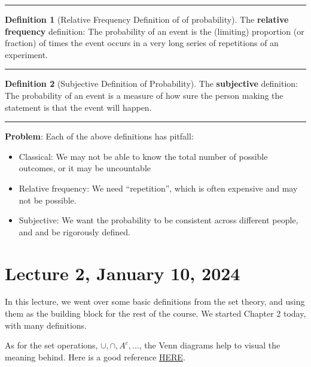 \documentclass[
]{book}
\providecommand{\tightlist}{%
  \setlength{\itemsep}{0pt}\setlength{\parskip}{0pt}}
\theoremstyle{definition}
\newtheorem{definition}{Definition}[chapter]
\theoremstyle{definition}
\theoremstyle{definition}
\theoremstyle{definition}
\theoremstyle{remark}
\begin{document}
\begin{center}\rule{0.5\linewidth}{0.5pt}\end{center}

\begin{definition}[Relative Frequency Definition of of probability]
The \textbf{relative frequency} definition: The probability of an event
is the (limiting) proportion (or fraction) of times the event occurs in a very
long series of repetitions of an experiment.
\end{definition}

\begin{center}\rule{0.5\linewidth}{0.5pt}\end{center}

\begin{definition}[Subjective Definition of Probability]
The \textbf{subjective} definition: The probability of an event is a measure of how sure the person making the statement is that the event will happen.
\end{definition}

\begin{center}\rule{0.5\linewidth}{0.5pt}\end{center}

\textbf{Problem}: Each of the above definitions has pitfall:

\begin{itemize}
\tightlist
\item
  Classical: We may not be able to know the total number of possible outcomes, or it may be uncountable
\item
  Relative frequency: We need ``repetition'', which is often expensive and may not be possible.
\item
  Subjective: We want the probability to be consistent across different people, and and be rigorously defined.
\end{itemize}

\hypertarget{lecture-2-january-10-2024}{%
\chapter{Lecture 2, January 10, 2024}\label{lecture-2-january-10-2024}}

In this lecture, we went over some basic definitions from the set theory, and using them as the building block for the rest of the course. We started Chapter 2 today, with many definitions.

As for the set operations, \(\cup,\cap,A^c,...\), the Venn diagrams help to visual the meaning behind. Here is a good reference \href{https://www.edrawmax.com/article/venn-diagram-symbols-and-set-notations.html}{HERE}.
\end{document}
